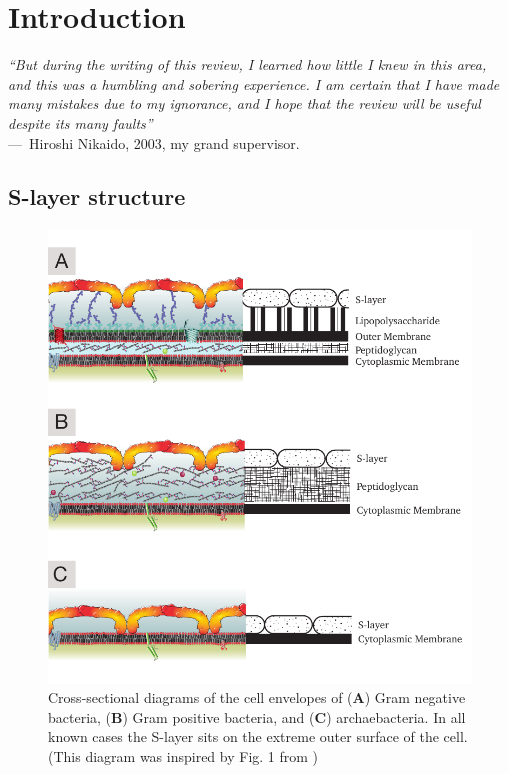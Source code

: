 
\acresetall{}

\chapter{Introduction}
\label{ch:Introduction}

    \begin{epigraph}
            \emph{``But during the writing of this review, I learned how little I knew in this area, and this was a humbling and sobering experience. I am certain that I have made many mistakes due to my ignorance, and I hope that the review will be useful despite its many faults''}\\ ---~Hiroshi Nikaido, 2003, my grand supervisor.
    \end{epigraph}
    \section{S-layer structure} %
    \label{sec:s_layer_structure}
    
        \begin{figure}[p] %
                \begin{center}
                    \includegraphics{intro/img/celwalls.pdf}
                \end{center}
                \caption[Cross-sectional diagrams of \ac{S-layer} containing cell envelopes]{Cross-sectional diagrams of the cell envelopes of (\textbf{A}) Gram negative bacteria, (\textbf{B}) Gram positive bacteria, and (\textbf{C}) archaebacteria. In all known cases the \ac{S-layer} sits on the extreme outer surface of the cell. (This diagram was inspired by Fig. 1 from )}
            \label{fig:cellwalls}
        \end{figure}

